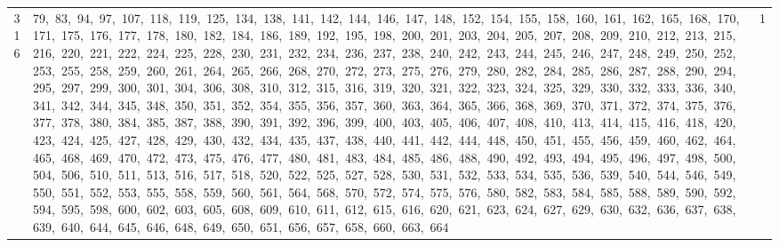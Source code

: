 \begin{longtable}{c|p{}|r}
316 & 79,\ 83,\ 94,\ 97,\ 107,\ 118,\ 119,\ 125,\ 134,\ 138,\ 141,\ 142,\ 144,\ 146,\ 147,\ 148,\ 152,\ 154,\ 155,\ 158,\ 160,\ 161,\ 162,\ 165,\ 168,\ 170,\ 171,\ 175,\ 176,\ 177,\ 178,\ 180,\ 182,\ 184,\ 186,\ 189,\ 192,\ 195,\ 198,\ 200,\ 201,\ 203,\ 204,\ 205,\ 207,\ 208,\ 209,\ 210,\ 212,\ 213,\ 215,\ 216,\ 220,\ 221,\ 222,\ 224,\ 225,\ 228,\ 230,\ 231,\ 232,\ 234,\ 236,\ 237,\ 238,\ 240,\ 242,\ 243,\ 244,\ 245,\ 246,\ 247,\ 248,\ 249,\ 250,\ 252,\ 253,\ 255,\ 258,\ 259,\ 260,\ 261,\ 264,\ 265,\ 266,\ 268,\ 270,\ 272,\ 273,\ 275,\ 276,\ 279,\ 280,\ 282,\ 284,\ 285,\ 286,\ 287,\ 288,\ 290,\ 294,\ 295,\ 297,\ 299,\ 300,\ 301,\ 304,\ 306,\ 308,\ 310,\ 312,\ 315,\ 316,\ 319,\ 320,\ 321,\ 322,\ 323,\ 324,\ 325,\ 329,\ 330,\ 332,\ 333,\ 336,\ 340,\ 341,\ 342,\ 344,\ 345,\ 348,\ 350,\ 351,\ 352,\ 354,\ 355,\ 356,\ 357,\ 360,\ 363,\ 364,\ 365,\ 366,\ 368,\ 369,\ 370,\ 371,\ 372,\ 374,\ 375,\ 376,\ 377,\ 378,\ 380,\ 384,\ 385,\ 387,\ 388,\ 390,\ 391,\ 392,\ 396,\ 399,\ 400,\ 403,\ 405,\ 406,\ 407,\ 408,\ 410,\ 413,\ 414,\ 415,\ 416,\ 418,\ 420,\ 423,\ 424,\ 425,\ 427,\ 428,\ 429,\ 430,\ 432,\ 434,\ 435,\ 437,\ 438,\ 440,\ 441,\ 442,\ 444,\ 448,\ 450,\ 451,\ 455,\ 456,\ 459,\ 460,\ 462,\ 464,\ 465,\ 468,\ 469,\ 470,\ 472,\ 473,\ 475,\ 476,\ 477,\ 480,\ 481,\ 483,\ 484,\ 485,\ 486,\ 488,\ 490,\ 492,\ 493,\ 494,\ 495,\ 496,\ 497,\ 498,\ 500,\ 504,\ 506,\ 510,\ 511,\ 513,\ 516,\ 517,\ 518,\ 520,\ 522,\ 525,\ 527,\ 528,\ 530,\ 531,\ 532,\ 533,\ 534,\ 535,\ 536,\ 539,\ 540,\ 544,\ 546,\ 549,\ 550,\ 551,\ 552,\ 553,\ 555,\ 558,\ 559,\ 560,\ 561,\ 564,\ 568,\ 570,\ 572,\ 574,\ 575,\ 576,\ 580,\ 582,\ 583,\ 584,\ 585,\ 588,\ 589,\ 590,\ 592,\ 594,\ 595,\ 598,\ 600,\ 602,\ 603,\ 605,\ 608,\ 609,\ 610,\ 611,\ 612,\ 615,\ 616,\ 620,\ 621,\ 623,\ 624,\ 627,\ 629,\ 630,\ 632,\ 636,\ 637,\ 638,\ 639,\ 640,\ 644,\ 645,\ 646,\ 648,\ 649,\ 650,\ 651,\ 656,\ 657,\ 658,\ 660,\ 663,\ 664 & 1 \\

\end{longtable}
